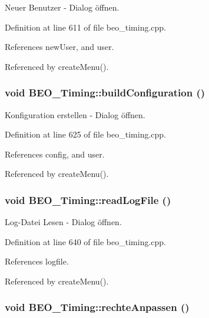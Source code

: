Neuer Benutzer - Dialog öffnen. 



Definition at line 611 of file beo\_\-timing.cpp.

References newUser, and user.

Referenced by createMenu().\hypertarget{class_b_e_o___timing_c8299f8565050c6390965b2a1df80ab0}{
\subsubsection[buildConfiguration]{\setlength{\rightskip}{0pt plus 5cm}void BEO\_\-Timing::buildConfiguration ()}}
\label{class_b_e_o___timing_c8299f8565050c6390965b2a1df80ab0}


Konfiguration erstellen - Dialog öffnen. 



Definition at line 625 of file beo\_\-timing.cpp.

References config, and user.

Referenced by createMenu().\hypertarget{class_b_e_o___timing_0e2af5a5752098ca296327f4f41bf2c6}{
\subsubsection[readLogFile]{\setlength{\rightskip}{0pt plus 5cm}void BEO\_\-Timing::readLogFile ()}}
\label{class_b_e_o___timing_0e2af5a5752098ca296327f4f41bf2c6}


Log-Datei Lesen - Dialog öffnen. 



Definition at line 640 of file beo\_\-timing.cpp.

References logfile.

Referenced by createMenu().\hypertarget{class_b_e_o___timing_92ea80de324e788dbc928e655b70e631}{
\subsubsection[rechteAnpassen]{\setlength{\rightskip}{0pt plus 5cm}void BEO\_\-Timing::rechteAnpassen ()}}
\label{class_b_e_o___timing_92ea80de324e788dbc928e655b70e631}


